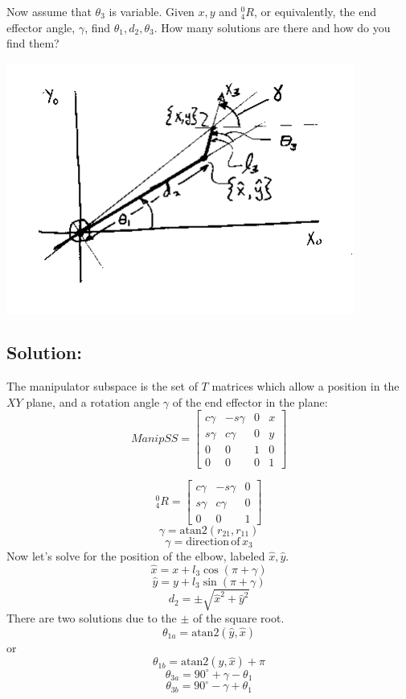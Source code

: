 \begin{Example}

Now assume that $\theta_3$ is variable.
Given $x,y$ and $^0_4R$, or equivalently, the end effector angle, $\gamma$, find $\theta_1, d_2, \theta_3$. How many solutions are there and how do you find them?



\includegraphics[width=4.5in]{figs04/00089.png}

\subsection*{Solution:}

The manipulator subspace is the set of $T$ matrices which allow a position in the $XY$ plane,
and a rotation angle $\gamma$ of the end effector in the plane:
\[
ManipSS = \begin{bmatrix}
c\gamma & -s\gamma & 0  & x\\
s\gamma & c\gamma & 0  & y\\
0 & 0 &  1 & 0 \\
0&0&0&1
\end{bmatrix}
\]

\[
^0_4R =
\left[ \begin{array}{ccc}
c\gamma & -s\gamma & 0 \\
s\gamma & c\gamma & 0 \\
0 & 0 & 1
\end{array} \right]
\]
\[
\gamma = \mathrm{atan2}(r_{21}, r_{11})
\]
\[
\gamma = \mathrm{direction\, of\,} x_{3}
\]
Now let's solve for the position of the elbow, labeled $\hat{x},\hat{y}$.
\[
\hat{x}=x+l_3\cos(\pi+\gamma)
\]
\[
\hat{y}=y+l_3\sin(\pi+\gamma)
\]
\[
d_2 = \pm \sqrt{\hat{x}^2 + \hat{y}^2}
\]
There are two solutions due to the $\pm$ of the square root.
\[
\theta_{1a}=\mathrm{atan2}(\hat{y},\hat{x})
\]
or
\[
\theta_{1b}=\mathrm{atan2}(\hat{y},\hat{x})+\pi
\]
\[
\theta_{3a} = 90^\circ + \gamma - \theta_1
\]
\[
\theta_{3b} = 90^\circ - \gamma + \theta_1
\]
\end{Example}

